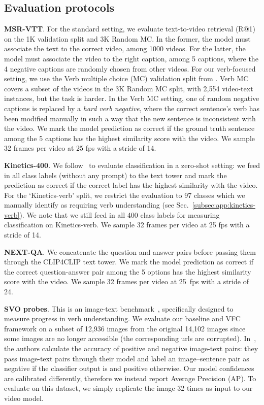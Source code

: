 \subsection{Evaluation protocols}\label{subsec:app:eval_proto}

\noindent \textbf{MSR-VTT}. For the standard setting, we evaluate text-to-video retrieval (R@1) on the 1K validation split and 3K Random MC. In the former, the model must associate the text to the correct video, among 1000 videos. For the latter, the model must associate the video to the right caption, among 5 captions, where the 4 negative captions are randomly chosen from other videos. For our verb-focused setting, we use the Verb multiple choice (MC) validation split from \cite{park-etal-2022-exposing}. Verb MC covers a subset of the videos in the 3K Random MC split, with 2,554 video-text instances, but the task is harder. In the Verb MC setting, one of random negative captions is replaced by a \textit{hard verb negative}, where the correct sentence's verb has been modified manually in such a way that the new sentence is inconsistent with the video. We mark the model prediction as correct if the ground truth sentence among the 5 captions has the highest similarity score with the video. We sample 32 frames per video at 25 fps with a stride of 14.

\noindent \textbf{Kinetics-400}. We follow~\cite{Radford2021CLIP} to evaluate classification in a zero-shot setting: we feed in all class labels (without any prompt) to the text tower and mark the prediction as correct if the correct label has the highest similarity with the video. For the `Kinetics-verb' split, we restrict the evaluation to 97 classes which we manually identify as requiring verb understanding (see Sec.~\ref{subsec:app:kinetics-verb}). We note that we still feed in all 400 class labels for measuring classification on Kinetics-verb. We sample 32 frames per video at 25 fps with a stride of 14.

\noindent \textbf{NEXT-QA}. We concatenate the question and answer pairs before passing them through the CLIP4CLIP text tower. We mark the model prediction as correct if the correct question-answer pair among the 5 options has the highest similarity score with the video. We sample 32 frames per video at 25~fps with a stride of 24.

\noindent \textbf{SVO probes}. This is an image-text benchmark~\cite{hendricks2021probing}, specifically designed to measure progress in verb understanding. We evaluate our baseline and VFC framework on a subset of 12,936 images from the original 14,102 images since some images are no longer accessible (the corresponding urls are corrupted). In~\cite{hendricks2021probing}, the authors calculate the accuracy of positive and negative image-text pairs: they pass image-text pairs through their model and label an image–sentence pair as negative if the classifier output is  and
positive otherwise. Our model confidences are calibrated differently, therefore we instead report Average Precision (AP). To evaluate on this dataset, we simply replicate the image 32 times as input to our video model.


